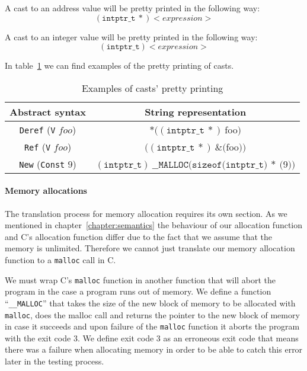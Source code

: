 A cast to an address value will be pretty printed in the following way:
\begin{equation*}
(\mathtt{intptr\_t}\ *) <expression>
\end{equation*}

A cast to an integer value will be pretty printed in the following way:
\begin{equation*}
(\mathtt{intptr\_t}) <expression>
\end{equation*}

In table~\ref{tab:pretty_casts} we can find examples of the pretty printing of casts.

\begin{table}[h!]
\centering
\begin{tabular}{|c|c|}
  \hline
  \textbf{Abstract syntax} & \textbf{String representation} \\ [0.5ex]
  \hline \hline
  \verb|Deref| (\verb|V| $foo$) & $*((\mathtt{intptr\_t}\ *)\ $foo$)$ \\
  \verb|Ref| (\verb|V| $foo$)   & $((\mathtt{intptr\_t}\ *)\ \&($foo$))$ \\
  \verb|New| (\verb|Const| $9$) & $(\mathtt{intptr\_t})\ \mathtt{\_\_MALLOC}(\mathtt{sizeof}(\mathtt{intptr\_t)}\ *\ ($9$))$ \\
  \hline
\end{tabular}

\caption{Examples of casts' pretty printing}
\label{tab:pretty_casts}
\end{table}


\paragraph{Memory allocations}

The translation process for memory allocation requires its own section.
As we mentioned in chapter~\ref{chapter:semantics} the behaviour of our allocation function and C's allocation function differ due to the fact that we assume that the memory is unlimited.
Therefore we cannot just translate our memory allocation function to a \verb|malloc| call in C.

We must wrap C's \verb|malloc| function in another function that will abort the program in the case a program runs out of memory.
We define a function ``\verb|__MALLOC|'' that takes the size of the new block of memory to be allocated with \verb|malloc|, does the malloc call and returns the pointer to the new block of memory in case it succeeds and upon failure of the \verb|malloc| function it aborts the program with the exit code 3.
We define exit code 3 as an erroneous exit code that means there was a failure when allocating memory in order to be able to catch this error later in the testing process.




